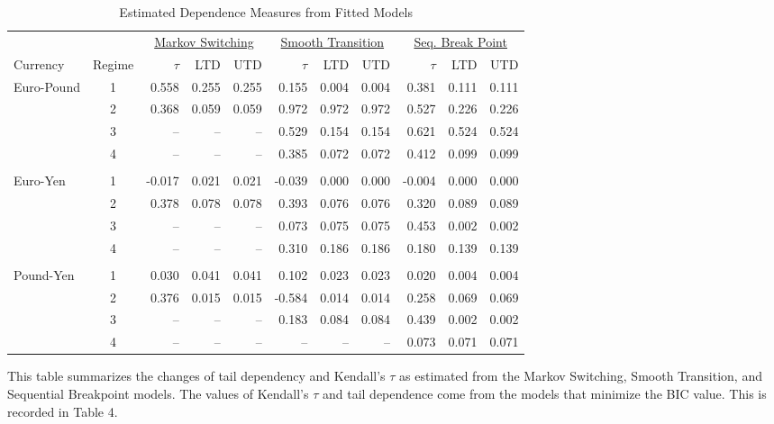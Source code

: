\documentclass[12pt]{article}
\begin{document}
\begin{landscape}
\begin{table}
	\centering
	\caption{Estimated Dependence Measures from Fitted Models}
	\begin{tabular}[c]{l c r r r | r r r | r r r}
		\midrule
		         &        & \multicolumn{3}{c}{\underline{Markov Switching}} & \multicolumn{3}{c}{\underline{Smooth Transition}} & \multicolumn{3}{c}{\underline{Seq. Break Point}} \\
		Currency & Regime & $\tau$ & LTD & UTD & $\tau$ & LTD & UTD & $\tau$ & LTD & UTD \\
		\midrule
		Euro-Pound  & 1 &  0.558 & 0.255 & 0.255 &  0.155 & 0.004 & 0.004 &  0.381 & 0.111 & 0.111 \\
					& 2 &  0.368 & 0.059 & 0.059 &  0.972 & 0.972 & 0.972 &  0.527 & 0.226 & 0.226 \\
					& 3 &     -- &    -- &    -- &  0.529 & 0.154 & 0.154 &  0.621 & 0.524 & 0.524 \\
					& 4 &     -- &    -- &    -- &  0.385 & 0.072 & 0.072 &  0.412 & 0.099 & 0.099 \\ \\
		Euro-Yen    & 1 & -0.017 & 0.021 & 0.021 & -0.039 & 0.000 & 0.000 & -0.004 & 0.000 & 0.000 \\
					& 2 &  0.378 & 0.078 & 0.078 &  0.393 & 0.076 & 0.076 &  0.320 & 0.089 & 0.089 \\
					& 3 &     -- &    -- &    -- &  0.073 & 0.075 & 0.075 &  0.453 & 0.002 & 0.002 \\
					& 4 &     -- &    -- &    -- &  0.310 & 0.186 & 0.186 &  0.180 & 0.139 & 0.139 \\ \\
		Pound-Yen   & 1 &  0.030 & 0.041 & 0.041 &  0.102 & 0.023 & 0.023 &  0.020 & 0.004 & 0.004 \\
		            & 2 &  0.376 & 0.015 & 0.015 & -0.584 & 0.014 & 0.014 &  0.258 & 0.069 & 0.069 \\
		            & 3 &     -- &    -- &    -- &  0.183 & 0.084 & 0.084 &  0.439 & 0.002 & 0.002 \\
		            & 4 &     -- &    -- &    -- &     -- &    -- &    -- &  0.073 & 0.071 & 0.071 \\
		\hline
	\end{tabular}
	\begin{tablenotes}
		\item{\footnotesize This table summarizes the changes of tail dependency and Kendall's $\tau$ as estimated from the Markov Switching, Smooth Transition, and Sequential Breakpoint models. The values of Kendall's $\tau$ and tail dependence come from the models that minimize the BIC value. This is recorded in Table 4.}
	\end{tablenotes}
	\label{tbl:dependence_measure_summary}
\end{table}

\end{landscape}
\end{document}
